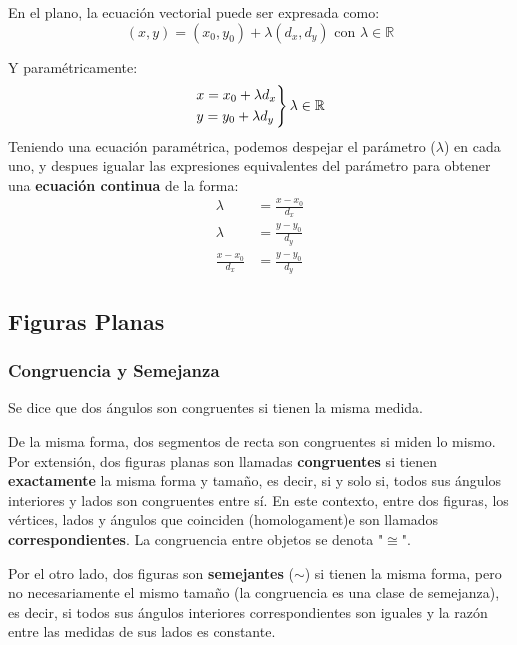 En el plano, la ecuación vectorial puede ser expresada como:\\

\begin{equation*}
(x, y) = (x_0, y_0) + \lambda(d_x,d_y) \text{ con } \lambda \in \mathbb{R}
\end{equation*}

Y paramétricamente:
\begin{equation*}
    \begin{rcases}
      x = x_0 + \lambda d_x \\
      y = y_0 + \lambda d_y
    \end{rcases}
    \lambda \in \mathbb{R}
    \end{equation*}
Teniendo una ecuación paramétrica, podemos despejar el parámetro ($\lambda$) en cada uno, y despues igualar las expresiones equivalentes del parámetro para obtener una \textbf{ecuación continua} de la forma:
\begin{equation*}
\begin{split}
    \lambda &= \frac{x - x_0}{d_x}\\
    \lambda &= \frac{y - y_0}{d_y}\\
    \frac{x-x_0}{d_x} &= \frac{y-y_0}{d_y}
\end{split}
\end{equation*}
\subsection{Figuras Planas}
\subsubsection{Congruencia y Semejanza}
Se dice que dos ángulos son congruentes si tienen la misma medida.

De la misma forma, dos segmentos de recta son congruentes si miden lo mismo. \\

Por extensión, dos figuras planas son llamadas \textbf{congruentes} si tienen \textbf{exactamente} la misma forma y tamaño, es decir, si y solo si, todos sus ángulos interiores y lados son congruentes entre sí.
En este contexto, entre dos figuras, los vértices, lados y ángulos que coinciden (homologament)e son llamados \textbf{correspondientes}. La congruencia entre objetos se denota "$\cong$".

Por el otro lado, dos figuras son \textbf{semejantes} ($\sim$) si tienen la misma forma, pero no necesariamente el mismo tamaño (la congruencia es una clase de semejanza), es decir, si todos sus ángulos interiores correspondientes son iguales y la razón entre las medidas de sus lados es constante.\\
